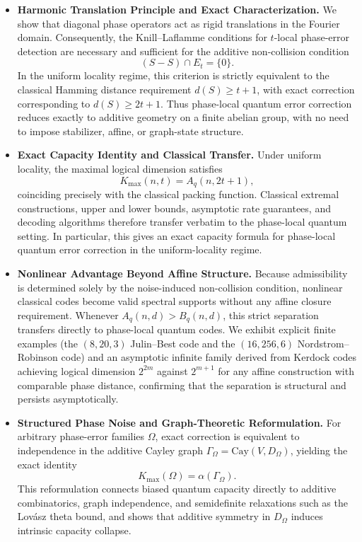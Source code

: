 \documentclass[a4paper,twocolumn,11pt,allowtoday]{quantumarticle}
\theoremstyle{plain}
\theoremstyle{definition}
\theoremstyle{remark}
\begin{document}
\begin{itemize}

\item \textbf{Harmonic Translation Principle and Exact Characterization.}
We show that diagonal phase operators act as rigid translations in the Fourier domain. Consequently, the Knill–Laflamme conditions for $t$-local phase-error detection are necessary and sufficient for the additive non-collision condition
\[
(S-S)\cap E_t=\{0\}.
\]
In the uniform locality regime, this criterion is strictly equivalent to the classical Hamming distance requirement $d(S)\ge t+1$, with exact correction corresponding to $d(S)\ge 2t+1$. Thus phase-local quantum error correction reduces exactly to additive geometry on a finite abelian group, with no need to impose stabilizer, affine, or graph-state structure.

\item \textbf{Exact Capacity Identity and Classical Transfer.}
Under uniform locality, the maximal logical dimension satisfies
\[
K_{\max}(n,t)=A_q(n,2t+1),
\]
coinciding precisely with the classical packing function. Classical extremal constructions, upper and lower bounds, asymptotic rate guarantees, and decoding algorithms therefore transfer verbatim to the phase-local quantum setting. In particular, this gives an exact capacity formula for phase-local quantum error correction in the uniform-locality regime.

\item \textbf{Nonlinear Advantage Beyond Affine Structure.}
Because admissibility is determined solely by the noise-induced non-collision condition, nonlinear classical codes become valid spectral supports without any affine closure requirement. Whenever $A_q(n,d)>B_q(n,d)$, this strict separation transfers directly to phase-local quantum codes. We exhibit explicit finite examples (the $(8,20,3)$ Julin--Best code and the $(16,256,6)$ Nordstrom--Robinson code) and an asymptotic infinite family derived from Kerdock codes achieving logical dimension $2^{2m}$ against $2^{m+1}$ for any affine construction with comparable phase distance, confirming that the separation is structural and persists asymptotically.


\item \textbf{Structured Phase Noise and Graph-Theoretic Reformulation.}
For arbitrary phase-error families $\Omega$, exact correction is equivalent to independence in the additive Cayley graph $\Gamma_\Omega=\mathrm{Cay}(V,D_\Omega)$, yielding the exact identity
\[
K_{\max}(\Omega)=\alpha(\Gamma_\Omega).
\]
This reformulation connects biased quantum capacity directly to additive combinatorics, graph independence, and semidefinite relaxations such as the Lovász theta bound, and shows that additive symmetry in $D_\Omega$ induces intrinsic capacity collapse.


\end{itemize}
\end{document}
